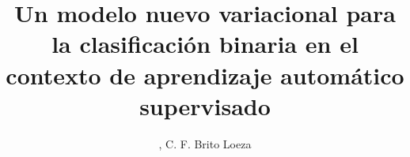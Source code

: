 \documentclass{INGUADY}
\begin{document}

\title{Un modelo nuevo variacional para la clasificación binaria en el contexto de aprendizaje automático supervisado}

\author {
     ,
    C. F. Brito Loeza
}

\end{document}
